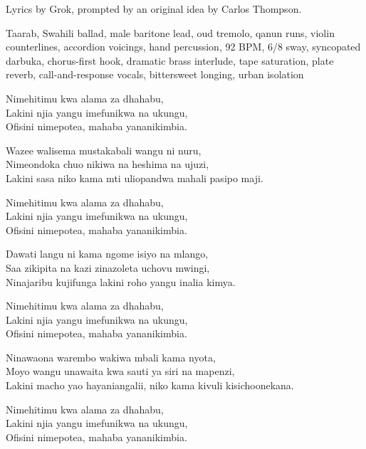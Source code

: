 
\label{sec:kijana-msomi}
\begin{notes}
Lyrics by Grok, prompted by an original idea by Carlos Thompson.
\end{notes}
\begin{style}
Taarab, Swahili ballad, male baritone lead, oud tremolo, qanun runs, violin counterlines, accordion voicings, hand percussion, 92 BPM, 6/8 sway, syncopated darbuka, chorus-first hook, dramatic brass interlude, tape saturation, plate reverb, call-and-response vocals, bittersweet longing, urban isolation
\end{style}
\begin{lyrics}
Nimehitimu kwa alama za dhahabu,\\
Lakini njia yangu imefunikwa na ukungu,\\
Ofisini nimepotea, mahaba yananikimbia.

Wazee walisema mustakabali wangu ni nuru,\\
Nimeondoka chuo nikiwa na heshima na ujuzi,\\
Lakini sasa niko kama mti uliopandwa mahali pasipo maji.

Nimehitimu kwa alama za dhahabu,\\
Lakini njia yangu imefunikwa na ukungu,\\
Ofisini nimepotea, mahaba yananikimbia.

Dawati langu ni kama ngome isiyo na mlango,\\
Saa zikipita na kazi zinazoleta uchovu mwingi,\\
Ninajaribu kujifunga lakini roho yangu inalia kimya.

Nimehitimu kwa alama za dhahabu,\\
Lakini njia yangu imefunikwa na ukungu,\\
Ofisini nimepotea, mahaba yananikimbia.

Ninawaona warembo wakiwa mbali kama nyota,\\
Moyo wangu unawaita kwa sauti ya siri na mapenzi,\\
Lakini macho yao hayaniangalii, niko kama kivuli kisichoonekana.

Nimehitimu kwa alama za dhahabu,\\
Lakini njia yangu imefunikwa na ukungu,\\
Ofisini nimepotea, mahaba yananikimbia.


\end{lyrics}
